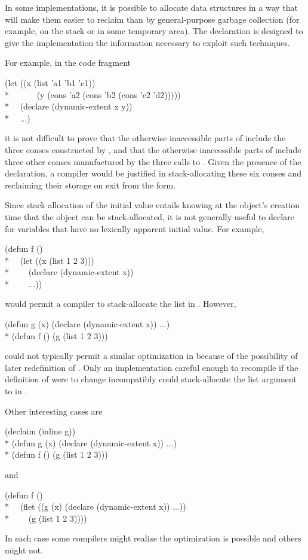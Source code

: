 \begin{newer}
\begin{flushdesc}
  In some implementations, it is
  possible to allocate data structures in a way that will make them
  easier to reclaim than by general-purpose garbage collection
  (for example, on the stack or in some temporary area).  The 
  declaration is designed to give the implementation the information
  necessary to exploit such techniques.

For example, in the code fragment
\begin{lisp}
(let ((x (list 'a1 'b1 'c1)) \\*
~~~~~~(y (cons 'a2 (cons 'b2 (cons 'c2 'd2))))) \\*
~~(declare (dynamic-extent x y)) \\*
~~...)
\end{lisp}
it is not difficult to prove that
the otherwise inaccessible parts of  include the three conses constructed by ,
and that the otherwise inaccessible parts of  include three other
conses manufactured by the three calls to .
Given the presence of the  declaration, a compiler would be
justified in stack-allocating these six conses and reclaiming their storage
on exit from the  form.

  Since stack allocation of the initial value entails knowing at the
  object's creation time that the object can be stack-allocated, it is
  not generally useful to declare  for variables
  that have no lexically apparent initial value. For example,
\begin{lisp}
(defun f () \\*
~~(let ((x (list 1 2 3))) \\*
~~~~(declare (dynamic-extent x)) \\*
~~~~...))
\end{lisp}
  would permit a compiler to stack-allocate the
  list in . However,
\begin{lisp}
(defun g (x) (declare (dynamic-extent x)) ...) \\*
(defun f () (g (list 1 2 3)))
\end{lisp}
  could not typically permit a similar optimization in  because of the
  possibility of later redefinition of .
  Only an implementation careful enough to recompile 
  if the definition of  were to change incompatibly could stack-allocate
  the list argument to  in .

  Other interesting cases are
\begin{lisp}
(declaim (inline g)) \\*
(defun g (x) (declare (dynamic-extent x)) ...) \\*
(defun f () (g (list 1 2 3)))
\end{lisp}
and
\begin{lisp}
(defun f () \\*
~~(flet ((g (x) (declare (dynamic-extent x)) ...)) \\*
~~~~(g (list 1 2 3))))
\end{lisp}
  In each case some compilers might realize the optimization is possible and others
  might not.


\end{flushdesc}
\end{newer}
